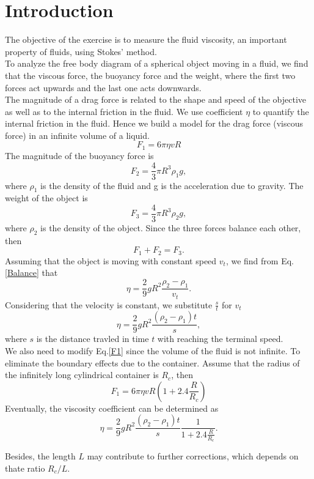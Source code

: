 \section{Introduction}
    The objective of the exercise is to measure the fluid viscosity, an important property of fluids, using Stokes' method.\\

    To analyze the free body diagram of a spherical object moving in a fluid, we find that the viscous force, the buoyancy force and the weight, where the first two forces act upwards and the last one  acts downwards.\\

    The magnitude of a drag force is related to the shape and speed of the objective as well as to the internal friction in the fluid. We use coefficient $\eta$ to quantify the internal friction in the fluid. Hence we build a model for the drag force (viscous force) in an infinite volume of a liquid.
    \begin{equation} \label{F1}
        F_1=6\pi\eta vR
    \end{equation}
    The magnitude of the buoyancy force is
    \[
        F_2=\frac{4}{3}\pi R^3\rho_1g,
    \]
    where $\rho_1$ is the density of the fluid and g is the acceleration due to gravity. The weight of the object is
    \[
        F_3=\frac{4}{3}\pi R^3\rho_2g,    
    \]
    where $\rho_2$ is the density of the object. Since the three forces balance each other, then 
    \begin{equation} \label{Balance}
        F_1+F_2=F_3.
    \end{equation}
    Assuming that the object is moving with constant speed $v_t$, we find from Eq. {\ref{Balance}} that
    \[
        \eta=\frac{2}{9}gR^2\frac{\rho_2-\rho_1}{v_t}.
    \]
    Considering that the velocity is constant, we substitute $\frac{s}{t}$ for $v_t$
    \begin{equation} \label{eta}
        \eta=\frac{2}{9}gR^2\frac{(\rho_2-\rho_1)t}{s},
    \end{equation}
    where $s$ is the distance travled in time $t$ with reaching the terminal speed.\\

    We also need to modify Eq.{\ref{F1}} since the volume of the fluid is not infinite. To eliminate the boundary effects due to the container. Assume that the radius of the infinitely long cylindrical container is $R_c$, then
    \[
        F_1=6\pi\eta vR(1+2.4\frac{R}{R_c})
    \]
    Eventually, the viscosity coefficient can be determined as
    \begin{equation} \label{eta2}
        \eta=\frac{2}{9}gR^2\frac{(\rho_2-\rho_1)t}{s}\frac{1}{1+2.4\frac{R}{R_c}}.
    \end{equation}
    
    Besides, the length $L$ may contribute to further corrections, which depends on thate ratio $R_c/L$.